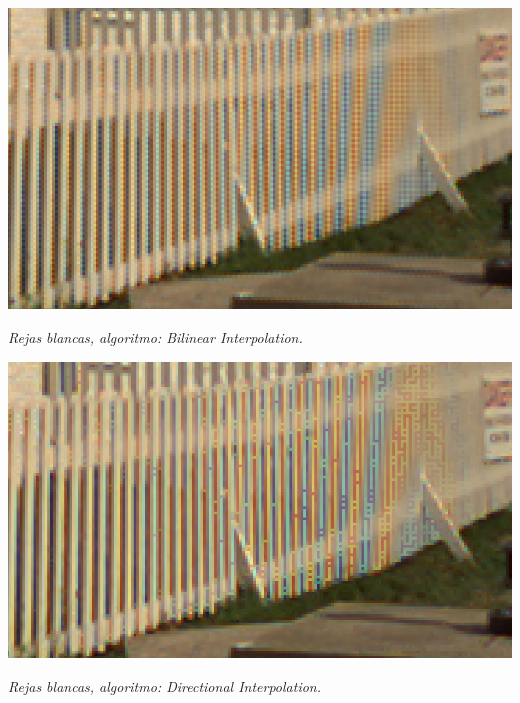 	\begin{center}
		\includegraphics[scale=.5]{../enunciado/images_files/cualitativo/pharo_rails_bilinear.png}
		\vspace{2pt}
		\par
		\footnotesize\textit{Rejas blancas, algoritmo: Bilinear Interpolation.}
	\end{center}


	\begin{center}
		\includegraphics[scale=.5]{../enunciado/images_files/cualitativo/pharo_rails_directional.png}
		\vspace{2pt}
		\par
		\footnotesize\textit{Rejas blancas, algoritmo: Directional Interpolation.}
	\end{center}


